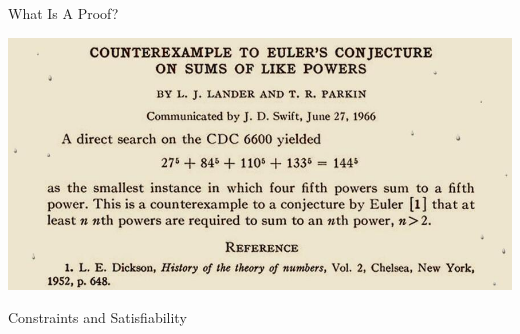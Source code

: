 \documentclass{beamer}
\begin{document}
\begin{frame}{What Is A Proof?}
    \begin{center}
        \includegraphics[keepaspectratio=true,scale=0.30]{shortest-math-paper.jpg}
    \end{center}
\end{frame}

\begin{frame}{Constraints and Satisfiability}
\end{frame}
\end{document}
